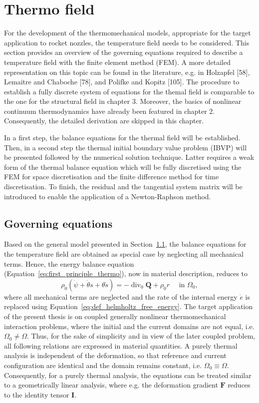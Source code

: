 \chapter{Thermo field}

For the development of the thermomechanical models, appropriate for the target application to rocket nozzles, the temperature field needs to be considered. This section provides an overview of the governing equations required to describe a temperature field with the finite element method (FEM). A more detailed representation on this topic can be found in the literature, e.g. in Holzapfel [58], Lemaitre and Chaboche [78], and Polifke and Kopitz [105]. The procedure to establish a fully discrete system of equations for the themal field is comparable to the one for the structural field in chapter 3. Moreover, the basics of nonlinear continuum thermodynamics have already been featured in chapter 2. Consequently, the detailed derivation are skipped in this chapter.

In a first step, the balance equations for the thermal field will be established. Then, in a second step the thermal initial boundary value problem (IBVP) will be presented followed by the numerical solution technique. Latter requires a weak form of the thermal balance equation which will be fully discretised using the FEM for space discretisation and the finite difference method for time discretisation. To finish, the residual and the tangential system matrix will be introduced to enable the application of a Newton-Raphson method.

\section{Governing equations}

Based on the general model presented in Section~\ref{}, the balance equations for the temperature field are obtained as special case by neglecting all mechanical terms.
Hence, the energy balance equation (Equation~\eqref{eq:first_principle_thermo}), now in material description, reduces to
\begin{equation}
\rho_0(\dot{\psi}+\dot{\theta} s+ \theta \dot{s})=-\operatorname{div}_0 \bm Q+\rho_0 r \quad \text { in } \Omega_0,
\end{equation}
where all mechanical terms are neglected and the rate of the internal energy \(\dot{e}\) is replaced using Equation~\eqref{eq:def_helmholtz_free_energy}.
The target application of the present thesis is on coupled generally nonlinear thermomechanical interaction problems, where the initial and the current domains are not equal, i.e. \(\Omega_{0} \neq \Omega\).
Thus, for the sake of simplicity and in view of the later coupled problem, all following relations are expressed in material quantities.
A purely thermal analysis is independent of the deformation, so that reference and current configuration are identical and the domain remains constant, i.e. \(\Omega_{0} \equiv \Omega\).
Consequently, for a purely thermal analysis, the equations can be treated similar to a geometrically linear analysis, where e.g. the deformation gradient \(\bm F\) reduces to the identity tensor \(\bm I\).

